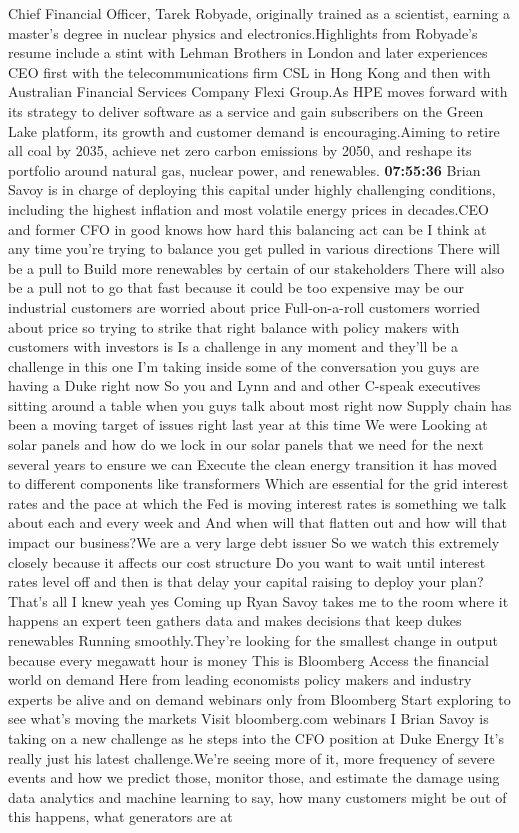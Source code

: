 \documentclass{article}%
\begin{document}
Chief Financial Officer, Tarek Robyade, originally trained as a scientist, earning a master's degree in nuclear physics and electronics.Highlights from Robyade's resume include a stint with Lehman Brothers in London and later experiences CEO first with the telecommunications firm CSL in Hong Kong and then with Australian Financial Services Company Flexi Group.As HPE moves forward with its strategy to deliver software as a service and gain subscribers on the Green Lake platform, its growth and customer demand is encouraging.Aiming to retire all coal by 2035, achieve net zero carbon emissions by 2050, and reshape its portfolio around natural gas, nuclear power, and renewables.%
\textbf{07:55:36}%
\newline%
Brian Savoy is in charge of deploying this capital under highly challenging conditions, including the highest inflation and most volatile energy prices in decades.CEO and former CFO in good knows how hard this balancing act can be I think at any time you're trying to balance you get pulled in various directions There will be a pull to Build more renewables by certain of our stakeholders There will also be a pull not to go that fast because it could be too expensive may be our industrial customers are worried about price Full{-}on{-}a{-}roll customers worried about price so trying to strike that right balance with policy makers with customers with investors is Is a challenge in any moment and they'll be a challenge in this one I'm taking inside some of the conversation you guys are having a Duke right now So you and Lynn and and other C{-}speak executives sitting around a table when you guys talk about most right now Supply chain has been a moving target of issues right last year at this time We were Looking at solar panels and how do we lock in our solar panels that we need for the next several years to ensure we can Execute the clean energy transition it has moved to different components like transformers Which are essential for the grid interest rates and the pace at which the Fed is moving interest rates is something we talk about each and every week and And when will that flatten out and how will that impact our business?We are a very large debt issuer So we watch this extremely closely because it affects our cost structure Do you want to wait until interest rates level off and then is that delay your capital raising to deploy your plan?That's all I knew yeah yes Coming up Ryan Savoy takes me to the room where it happens an expert teen gathers data and makes decisions that keep dukes renewables Running smoothly.They're looking for the smallest change in output because every megawatt hour is money This is Bloomberg Access the financial world on demand Here from leading economists policy makers and industry experts be alive and on demand webinars only from Bloomberg Start exploring to see what's moving the markets Visit bloomberg.com webinars I Brian Savoy is taking on a new challenge as he steps into the CFO position at Duke Energy It's really just his latest challenge.We're seeing more of it, more frequency of severe events and how we predict those, monitor those, and estimate the damage using data analytics and machine learning to say, how many customers might be out of this happens, what generators are at 
\end{document}
